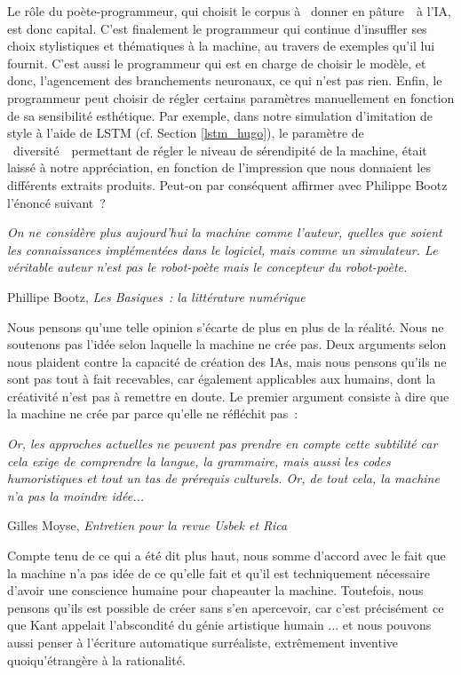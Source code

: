 \documentclass{article}
\newenvironment{citationbox}
{\begin{center}
		\begin{minipage}{.8\textwidth}
		}
		{
		\end{minipage}	
\end{center}
}
\begin{document}
				Le rôle du poète-programmeur, qui choisit le corpus à \guillemotleft~donner en pâture~\guillemotright~à l'IA, est donc capital. C'est finalement le programmeur qui continue d'insuffler ses choix stylistiques et thématiques à la machine, au travers de exemples qu'il lui fournit. C'est aussi le programmeur qui est en charge de choisir le modèle, et donc, l'agencement des branchements neuronaux, ce qui n'est pas rien. Enfin, le programmeur peut choisir de régler certains paramètres manuellement en fonction de sa sensibilité esthétique. Par exemple, dans notre simulation d'imitation de style à l'aide de LSTM (cf. Section \ref{lstm_hugo}), le paramètre de \guillemotleft~diversité~\guillemotright~permettant de régler le niveau de sérendipité de la machine, était laissé à notre appréciation, en fonction de l'impression que nous donnaient les différents extraits produits. Peut-on par conséquent affirmer avec Philippe Bootz l'énoncé suivant~?
				\begin{citationbox}
					\textit{On ne considère plus aujourd’hui la machine comme l’auteur, quelles que soient les connaissances implémentées dans le logiciel, mais comme un simulateur. Le véritable auteur n’est pas le robot-poète mais le concepteur du robot-poète.}
					\begin{flushright}
						Phillipe Bootz, \textit{Les Basiques~: la littérature numérique} \autocite{bootz2006}
					\end{flushright}
				\end{citationbox}
				
				Nous pensons qu'une telle opinion s'écarte de plus en plus de la réalité. Nous ne soutenons pas l'idée selon laquelle la machine ne crée pas. Deux arguments selon nous plaident contre la capacité de création des IAs, mais nous pensons qu'ils ne sont pas tout à fait recevables, car également applicables aux humains, dont la créativité n'est pas à remettre en doute. Le premier argument consiste à dire que la machine ne crée par parce qu'elle ne réfléchit pas~:
				\begin{citationbox}
					\textit{Or, les approches actuelles ne peuvent pas prendre en compte cette subtilité car cela exige de comprendre la langue, la grammaire, mais aussi les codes humoristiques et tout un tas de prérequis culturels. Or, de tout cela, la machine n’a pas la moindre idée...}
					\begin{flushright}
						Gilles Moyse, \textit{Entretien pour la revue Usbek et Rica} \autocite{edin2018}
					\end{flushright}
				\end{citationbox}
				Compte tenu de ce qui a été dit plus haut, nous somme d'accord avec le fait que la machine n'a pas idée de ce qu'elle fait et qu'il est techniquement nécessaire d'avoir une conscience humaine pour chapeauter la machine. Toutefois, nous pensons qu'ils est possible de créer sans s'en apercevoir, car c'est précisément ce que Kant appelait l'abscondité du génie artistique humain \autocite{kant1791}... et nous pouvons aussi penser à l'écriture automatique surréaliste, extrêmement inventive quoiqu'étrangère à la rationalité.\\
				
\end{document}
